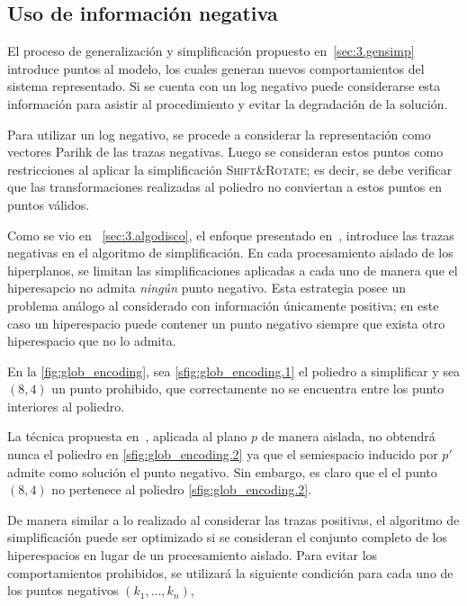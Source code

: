 \subsection{Uso de información negativa}
\label{sec:3.gensimp negative}

El proceso de generalización y simplificación propuesto en~\autoref{sec:3.gensimp} introduce puntos al modelo, 
los cuales generan nuevos comportamientos del sistema representado. Si se cuenta con un log negativo
puede considerarse esta información para asistir al procedimiento y evitar la degradación
de la solución.

Para utilizar un log negativo, se procede a considerar la representación como vectores Parihk de las trazas negativas.
Luego se consideran estos puntos como restricciones al aplicar la simplificación \textsc{Shift\&Rotate}; es decir, se debe 
verificar que las transformaciones realizadas al poliedro no conviertan a estos puntos en puntos válidos.

Como se vio en ~\autoref{sec:3.algodisco}, el enfoque presentado en~\cite{LeonCB15},
introduce las trazas negativas en el algoritmo de simplificación.
En cada procesamiento aislado de los hiperplanos, se limitan las simplificaciones 
aplicadas a cada uno de manera que el hiperesapcio no admita \emph{ningún} punto negativo.
Esta estrategia posee un problema análogo al considerado con información únicamente positiva; en este caso
un hiperespacio puede contener un punto negativo siempre que exista otro hiperespacio
que no lo admita.

\begin{example}
    En la \autoref{fig:glob_encoding}, sea \autoref{sfig:glob_encoding.1} el poliedro
    a simplificar y sea $(8,4)$ un punto prohibido, que correctamente no se encuentra entre los
    punto interiores al poliedro.
    
    La técnica propuesta en~\cite{LeonCB15}, aplicada al plano $p$ de manera aislada, 
    no obtendrá nunca el poliedro en \autoref{sfig:glob_encoding.2} ya que
    el semiespacio inducido por $p'$ admite como solución el punto negativo. Sin embargo, es claro que el
    el punto $(8,4)$ no pertenece al poliedro \autoref{sfig:glob_encoding.2}.
\end{example}

De manera similar a lo realizado al considerar las trazas positivas, el algoritmo de simplificación
puede ser optimizado si se consideran el conjunto completo de los hiperespacios en lugar de un
procesamiento aislado. 
Para evitar los comportamientos prohibidos, se utilizará la siguiente condición para cada 
uno de los puntos negativos $(k_1,\dots,k_n)$,

